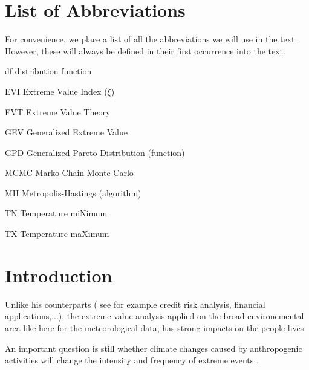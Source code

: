 \documentclass[11pt,a4paper,openany ]{book}
\newcommand{\abbrlabel}[1]{\makebox[3cm][l]{\textbf{#1}\ \dotfill}}
\newenvironment{abbreviations}{\begin{list}{}{\renewcommand{\makelabel}{\abbrlabel}}}{\end{list}}
\begin{document}


\chapter*{List of Abbreviations}
For convenience, we place a list of all the abbreviations we will use in the text. However, these will always be defined in their first occurrence into the text.\\

\begin{center}
\begin{abbreviations}
	\item [df]\label{df}  distribution function
	\item[EVI] Extreme Value Index ($\xi$)
	\item[EVT] Extreme Value Theory
	\item[GEV] Generalized Extreme Value
	\item[GPD] Generalized Pareto Distribution (function)
	\item[MCMC] Marko Chain Monte Carlo
	\item[MH] Metropolis-Hastings (algorithm)
	\item[TN] Temperature miNimum
	\item[TX] Temperature maXimum
	
\end{abbreviations}
\end{center}




\chapter*{Introduction}
\thispagestyle{empty}




Unlike his counterparts ( see for example credit risk analysis, financial applications,...), the extreme value analysis applied on the broad environemental area like here for the meteorological data, has strong impacts on the people lives 

An important question is still whether climate changes caused by anthropogenic activities will change the intensity and frequency of extreme events \cite{milly_climate_2008}.
\end{document}
